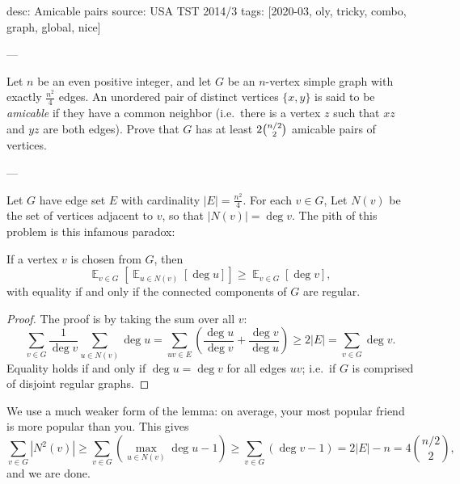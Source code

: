 desc: Amicable pairs
source: USA TST 2014/3
tags: [2020-03, oly, tricky, combo, graph, global, nice]

---

Let $n$ be an even positive integer, and let $G$ be an $n$-vertex simple graph with exactly $\tfrac{n^2}{4}$ edges. An unordered pair of distinct vertices $\{x,y\}$ is said to be \emph{amicable} if they have a common neighbor (i.e.\ there is a vertex $z$ such that $xz$ and $yz$ are both edges). Prove that $G$ has at least $2\tbinom{n/2}{2}$ amicable pairs of vertices.

---

Let $G$ have edge set $E$ with cardinality $|E|=\tfrac{n^2}4$. For each $v\in G$, Let $N(v)$ be the set of vertices adjacent to $v$, so that $|N(v)|=\deg v$. The pith of this problem is this infamous paradox:
\begin{lemma*}
    If a vertex $v$ is chosen from $G$, then \[\mathop{\mathbb E}_{v\in G}\left[\mathop{\mathbb E}_{u\in N(v)}[\deg u]\right]\ge\mathop{\mathbb E}_{v\in G}[\deg v],\]
    with equality if and only if the connected components of $G$ are regular.
\end{lemma*}
\begin{proof}
    The proof is by taking the sum over all $v$: \[\sum_{v\in G}\frac1{\deg v}\sum_{u\in N(v)}\deg u=\sum_{uv\in E}\left(\frac{\deg u}{\deg v}+\frac{\deg v}{\deg u}\right)\ge 2|E|=\sum_{v\in G}\deg v.\]
    Equality holds if and only if $\deg u=\deg v$ for all edges $uv$; i.e.\ if $G$ is comprised of disjoint regular graphs.
\end{proof}

We use a much weaker form of the lemma: on average, your most popular friend is more popular than you. This gives \[\sum_{v\in G}\left\lvert N^2(v)\right\rvert\ge\sum_{v\in G}\left(\max_{u\in N(v)}\deg u-1\right)\ge\sum_{v\in G}(\deg v-1)=2|E|-n=4\binom{n/2}2,\]
and we are done.
